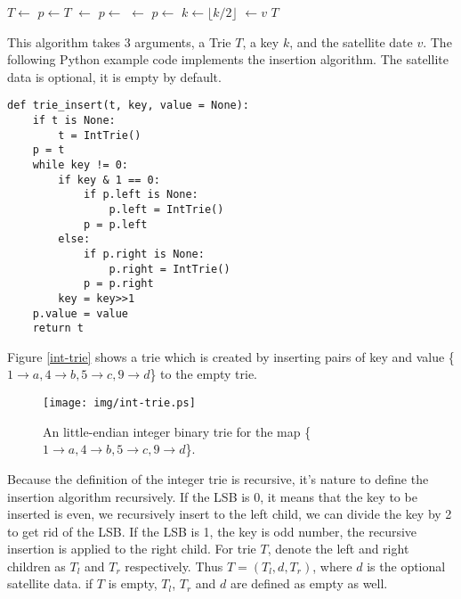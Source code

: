 \documentclass{article}
\begin{document}
\begin{algorithmic}[1]
    \State $T \gets$ 
  \EndIf
  \State $p \gets T$
        \State {} $\gets$ 
      \EndIf
      \State $p \gets$ 
    \Else
        \State {} $\gets$ 
      \EndIf
      \State $p \gets$ 
    \EndIf
    \State $k \gets \lfloor k/2 \rfloor$
  \EndWhile
  \State {} $\gets v$
  \State \Return $T$
\EndFunction
\end{algorithmic}

This algorithm takes 3 arguments, a Trie $T$, a key $k$, and the satellite
date $v$. The following Python example code implements the insertion algorithm.
The satellite data is optional, it is empty by default.

\lstset{language=Python}
\begin{lstlisting}
def trie_insert(t, key, value = None):
    if t is None:
        t = IntTrie()
    p = t
    while key != 0:
        if key & 1 == 0:
            if p.left is None:
                p.left = IntTrie()
            p = p.left
        else:
            if p.right is None:
                p.right = IntTrie()
            p = p.right
        key = key>>1
    p.value = value
    return t
\end{lstlisting}

Figure \ref{int-trie} shows a trie which is created by inserting
pairs of key and value
\{$ 1 \rightarrow a, 4 \rightarrow b, 5 \rightarrow c, 9 \rightarrow d$\}
to the empty trie.

\begin{figure}[htbp]
  \centering
  \texttt{[image: img/int-trie.ps]}
  \caption{An little-endian integer binary trie for the map
          \{$ 1 \rightarrow a, 4 \rightarrow b, 5 \rightarrow c, 9 \rightarrow d$\}.}
  \label{fig:int-trie}
\end{figure}

Because the definition of the integer trie is recursive, it's nature to define
the insertion algorithm recursively. If the LSB is 0, it
means that the key to be inserted is even, we recursively insert
to the left child, we can divide the key by 2 to get
rid of the LSB. If the LSB is 1, the key is odd number, the recursive
insertion is applied to the right child. For trie $T$,
denote the left and right children as $T_l$ and $T_r$ respectively.
Thus $T = (T_l, d, T_r)$, where $d$ is the optional satellite data.
if $T$ is empty, $T_l$, $T_r$ and $d$ are defined as empty as well.
\end{document}
